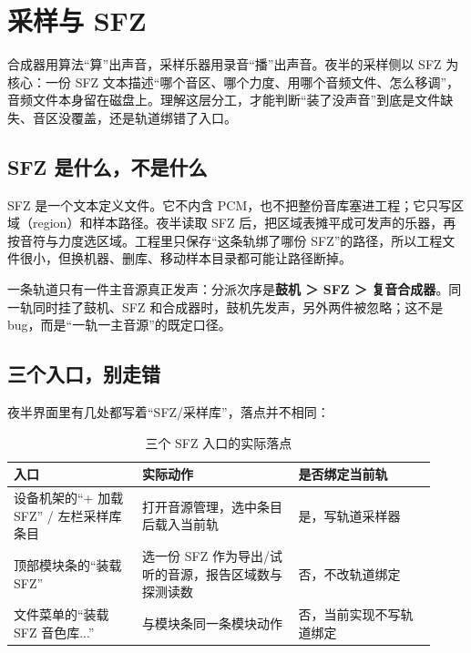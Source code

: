 \chapter{采样与 SFZ}
\label{chap:sampling-sfz}


合成器用算法“算”出声音，采样乐器用录音“播”出声音。夜半的采样侧以 SFZ 为核心：一份 SFZ 文本描述“哪个音区、哪个力度、用哪个音频文件、怎么移调”，音频文件本身留在磁盘上。理解这层分工，才能判断“装了没声音”到底是文件缺失、音区没覆盖，还是轨道绑错了入口。

\section{SFZ 是什么，不是什么}

SFZ 是一个文本定义文件。它不内含 PCM，也不把整份音库塞进工程；它只写区域（region）和样本路径。夜半读取 SFZ 后，把区域表摊平成可发声的乐器，再按音符与力度选区域。工程里只保存“这条轨绑了哪份 SFZ”的路径，所以工程文件很小，但换机器、删库、移动样本目录都可能让路径断掉。

一条轨道只有一件主音源真正发声：分派次序是\textbf{鼓机 ＞ SFZ ＞ 复音合成器}。同一轨同时挂了鼓机、SFZ 和合成器时，鼓机先发声，另外两件被忽略；这不是 bug，而是“一轨一主音源”的既定口径。

\section{三个入口，别走错}

夜半界面里有几处都写着“SFZ/采样库”，落点并不相同：

\begin{table}[htbp]
\centering
\small
\begin{tabular}{@{}p{0.28\linewidth}p{0.34\linewidth}p{0.30\linewidth}@{}}
\hline
入口 & 实际动作 & 是否绑定当前轨 \\
\hline
设备机架的“+ 加载 SFZ” / 左栏采样库条目 & 打开音源管理，选中条目后载入当前轨 & 是，写轨道采样器 \\
顶部模块条的“装载 SFZ” & 选一份 SFZ 作为导出/试听的音源，报告区域数与探测读数 & 否，不改轨道绑定 \\
文件菜单的“装载 SFZ 音色库...” & 与模块条同一条模块动作 & 否，当前实现不写轨道绑定 \\
\hline
\end{tabular}
\caption{三个 SFZ 入口的实际落点}
\label{tab:sfz-entry}
\end{table}

